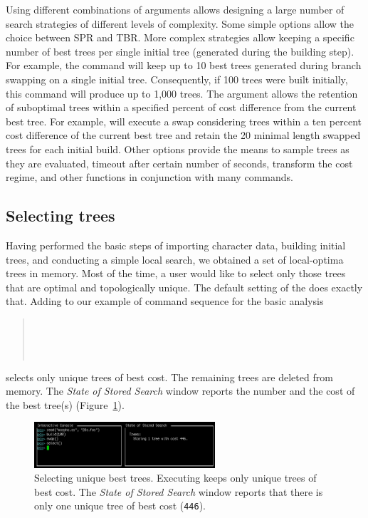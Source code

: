 Using different combinations of  arguments allows designing a  large number of search strategies of different levels of complexity. Some simple options allow the choice between SPR and TBR. More complex strategies allow keeping a specific number of best trees per single initial tree (generated during the building step). For example, the command  will keep up to 10 best trees generated during branch swapping on a single initial tree. Consequently, if 100 trees were built initially, this command will produce up to 1,000 trees. The argument  allows the retention of suboptimal trees within a specified percent of cost difference from the current best tree. For example,  will execute a swap considering trees within a ten percent cost difference of the current best tree and retain the 20 minimal length swapped trees for each initial build. Other options provide the means to sample trees as they are evaluated, timeout after certain number of seconds, transform the cost regime, and other functions in conjunction with many \poy commands.

\subsection{Selecting trees}

Having performed the basic steps of importing character data, building initial trees, and conducting a simple local search, we obtained a set of local-optima trees in memory. Most of the time, a user would like to select only those trees that are optimal and topologically unique. The default setting of the  does exactly that. Adding  to our example of command sequence for the basic analysis 
\begin{quote}
 	\\
 	\\
	\\
\end{quote}
selects only unique trees of best cost. The remaining trees are deleted from memory. The \emph{State of Stored Search} window reports the number and the cost of the best tree(s) (Figure~\ref{fig:select}).

\begin{figure}[]
    \begin{center}
        \includegraphics[width=0.6\textwidth]{figures/select.jpg}
    \end{center}
    \caption{Selecting unique best trees. Executing  keeps only unique trees of best cost. The \emph{State of Stored Search} window reports that there is only one unique tree of best cost (\texttt{446}).}
    \label{fig:select}
\end{figure}

